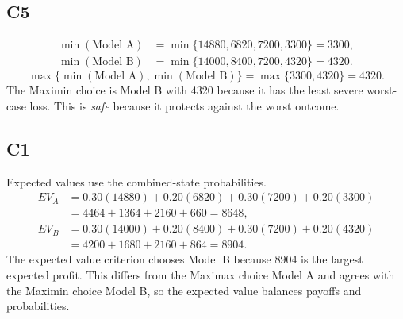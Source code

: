 \begin{ExamProblems}
		\subsection*{C5}
		\[
		\begin{aligned}
		\min(\text{Model A}) &= \min\{14880,6820,7200,3300\} = 3300,\\
		\min(\text{Model B}) &= \min\{14000,8400,7200,4320\} = 4320.
		\end{aligned}
		\]
		\[
		\max\{\min(\text{Model A}), \min(\text{Model B})\}
		= \max\{3300, 4320\}
		= 4320.
		\]
		The Maximin choice is Model B with 4320 because it has the least severe worst-case loss. This is \emph{safe} because it protects against the worst outcome.

		\subsection*{C1}
		Expected values use the combined-state probabilities.
		\[
		\begin{aligned}
		EV_A &= 0.30(14880)+0.20(6820)+0.30(7200)+0.20(3300)\\
		&= 4464+1364+2160+660=8648,\\
		EV_B &= 0.30(14000)+0.20(8400)+0.30(7200)+0.20(4320)\\
		&= 4200+1680+2160+864=8904.
		\end{aligned}
		\]
		The expected value criterion chooses Model B because 8904 is the largest expected profit. This differs from the Maximax choice Model A and agrees with the Maximin choice Model B, so the expected value balances payoffs and probabilities.
	\end{ExamProblems}

